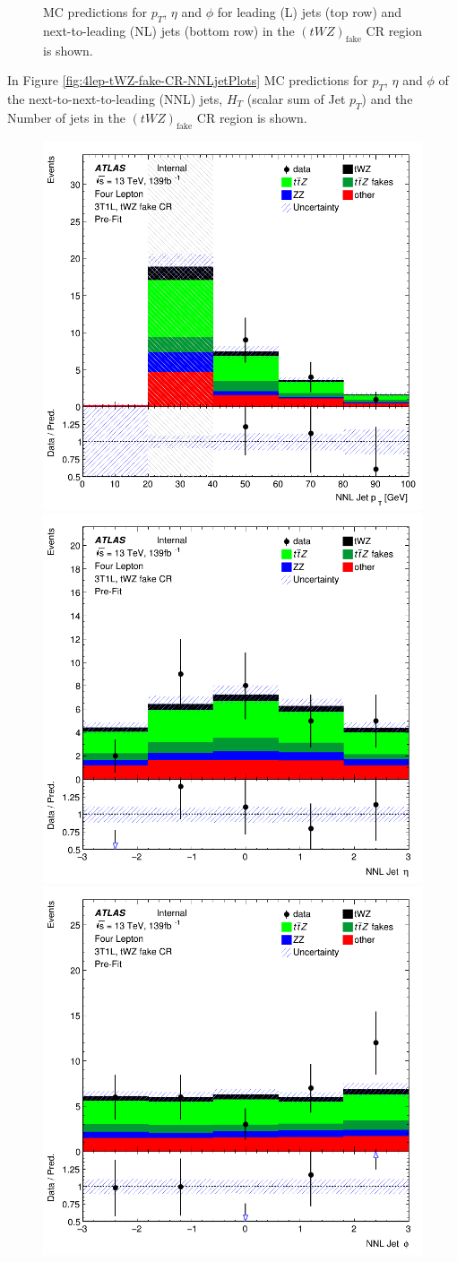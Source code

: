 \begin{figure}[htbp]
\begin{tabular}{ccc}
  \end{tabular}
    \caption{MC predictions for $p_{T}$, $\eta$ and $\phi$ for leading (L) jets (top row) and next-to-leading (NL) jets (bottom row) in the $(tWZ)_{\text{fake}}$ CR region  is shown.}
    \label{fig:4lep-tWZ-fake-CR-LandNjetPlots} 
\end{figure}

In Figure \ref{fig:4lep-tWZ-fake-CR-NNLjetPlots} MC predictions for $p_{T}$, $\eta$ and $\phi$ of the next-to-next-to-leading (NNL) jets, $H_{T}$ (scalar sum of Jet $p_{T}$) and the Number of jets in the $(tWZ)_{\text{fake}}$ CR region is shown.


\begin{figure}[htbp]
 \centering


    \includegraphics[width=.3\textwidth]{figures/PreFitPlots/lep4_tWZ_3T1L_NNLJet_pt.png} \quad
    \includegraphics[width=.3\textwidth]{figures/PreFitPlots/lep4_tWZ_3T1L_NNLJet_eta.png} \quad
    \includegraphics[width=.3\textwidth]{figures/PreFitPlots/lep4_tWZ_3T1L_NNLJet_phi.png}

    \medskip


\end{figure}
